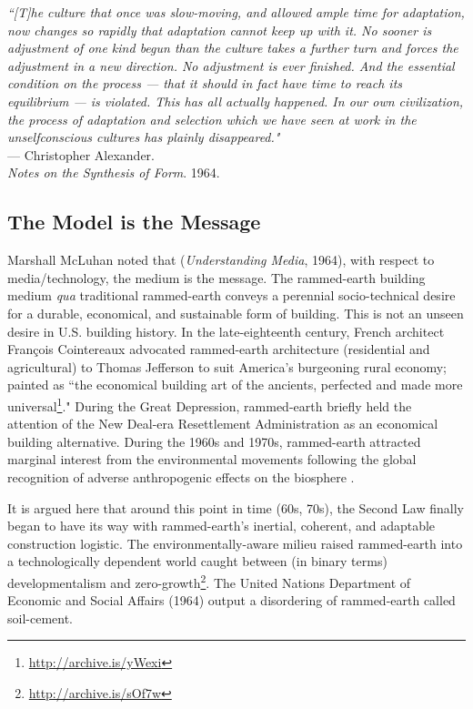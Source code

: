 \begin{flushright}
\small{
\textit{``[T]he culture that once was slow-moving, and allowed ample time for adaptation, now changes so rapidly that adaptation cannot keep up with it. No sooner is adjustment of one kind begun than the culture takes a further turn and forces the adjustment in a new direction. No adjustment is ever finished. And the essential condition on the process --- that it should in fact have time to reach its equilibrium --- is violated. This has all actually happened. In our own civilization, the process of adaptation and selection which we have seen at work in the unselfconscious cultures has plainly disappeared."}}\\ --- Christopher Alexander. \\ \textit{Notes on the Synthesis of Form}. 1964.
\end{flushright}

\clearpage

\subsection{The Model is the Message}

Marshall McLuhan noted that (\textit{Understanding Media}, 1964), with respect to media/technology, the medium is the message. The rammed-earth building medium \textit{qua} traditional rammed-earth conveys a perennial socio-technical desire for a durable, economical, and sustainable form of building. This is not an unseen desire in U.S. building history. In the late-eighteenth century, French architect Fran\c cois Cointereaux advocated rammed-earth architecture (residential and agricultural) to Thomas Jefferson to suit America's burgeoning rural economy; painted as ``the economical building art of the ancients, perfected and made more universal\footnote{\url{http://archive.is/yWexi}}." During the Great Depression, rammed-earth briefly held the attention of the New Deal-era Resettlement Administration as an economical building alternative. During the 1960s and 1970s, rammed-earth attracted marginal interest from the environmental movements following the global recognition of adverse anthropogenic effects on the biosphere \cite{GARDENDALE}.

It is argued here that around this point in time (60s, 70s), the Second Law finally began to have its way with rammed-earth's inertial, coherent, and adaptable construction logistic. The environmentally-aware milieu raised rammed-earth into a technologically dependent world caught between (in binary terms) developmentalism and zero-growth\footnote{\url{http://archive.is/sOf7w}}. The United Nations Department of Economic and Social Affairs (1964) output a disordering of rammed-earth called soil-cement.

